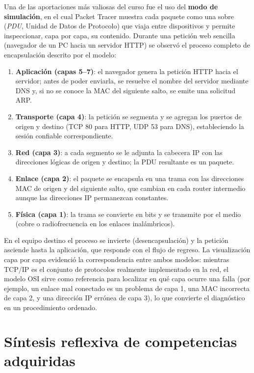 \documentclass[11pt,a4paper]{article}
\begin{document}
Una de las aportaciones más valiosas del curso fue el uso del \textbf{modo de
simulación}, en el cual Packet Tracer muestra cada paquete como una
sobre (\textit{PDU}, Unidad de Datos de Protocolo) que viaja entre dispositivos
y permite inspeccionar, capa por capa, su contenido. Durante una petición web
sencilla (navegador de un PC hacia un servidor HTTP) se observó el proceso
completo de encapsulación descrito por el modelo:

\begin{enumerate}
  \item \textbf{Aplicación (capas 5--7)}: el navegador genera la petición HTTP
        hacia el servidor; antes de poder enviarla, se resuelve el nombre del
        servidor mediante DNS y, si no se conoce la MAC del siguiente salto,
        se emite una solicitud ARP.
  \item \textbf{Transporte (capa 4)}: la petición se segmenta y se agregan los
        puertos de origen y destino (TCP 80 para HTTP, UDP 53 para DNS),
        estableciendo la sesión confiable correspondiente.
  \item \textbf{Red (capa 3)}: a cada segmento se le adjunta la cabecera IP
        con las direcciones lógicas de origen y destino; la PDU resultante es
        un paquete.
  \item \textbf{Enlace (capa 2)}: el paquete se encapsula en una trama con las
        direcciones MAC de origen y del siguiente salto, que cambian en cada
        router intermedio aunque las direcciones IP permanezcan constantes.
  \item \textbf{Física (capa 1)}: la trama se convierte en bits y se
        transmite por el medio (cobre o radiofrecuencia en los enlaces
        inalámbricos).
\end{enumerate}

En el equipo destino el proceso se invierte (desencapsulación) y la petición
asciende hasta la aplicación, que responde con el flujo de regreso. La
visualización capa por capa evidenció la correspondencia entre ambos modelos:
mientras TCP/IP es el conjunto de protocolos realmente implementado en la
red, el modelo OSI sirve como referencia para localizar en qué capa ocurre una
falla (por ejemplo, un enlace mal conectado es un problema de capa 1, una MAC
incorrecta de capa 2, y una dirección IP errónea de capa 3), lo que convierte
el diagnóstico en un procedimiento ordenado.

\section{Síntesis reflexiva de competencias adquiridas}
\end{document}
